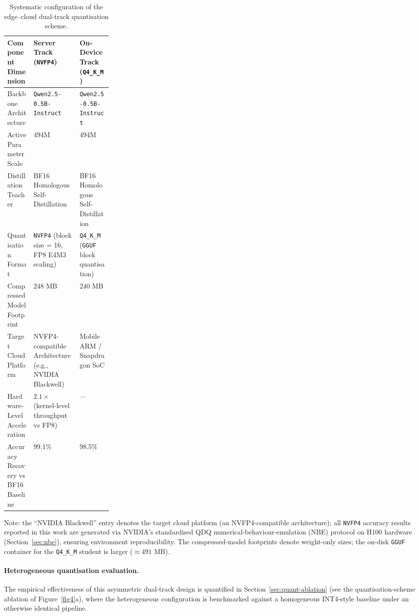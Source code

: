 \documentclass[a4paper,fleqn]{cas-sc}
\begin{document}
\begin{table}[t]
\centering
\renewcommand{\arraystretch}{1.15}
\caption{Systematic configuration of the edge--cloud dual-track quantisation scheme.}
\label{tab2-en}
\setlength{\tabcolsep}{8pt}
\begin{tabularx}{\textwidth}{>{\raggedright\arraybackslash}p{0.25\linewidth}XX}
\toprule
\textbf{Component Dimension} & \textbf{Server Track (\texttt{NVFP4})} & \textbf{On-Device Track (\texttt{Q4\_K\_M})} \\
\midrule
Backbone Architecture & \texttt{Qwen2.5-0.5B-Instruct} & \texttt{Qwen2.5-0.5B-Instruct} \\
Active Parameter Scale & 494M & 494M \\
Distillation Teacher & BF16 Homologous Self-Distillation & BF16 Homologous Self-Distillation \\
Quantisation Format & \texttt{NVFP4} (block size = 16, FP8 E4M3 scaling) & \texttt{Q4\_K\_M} (\texttt{GGUF} block quantisation) \\
Compressed Model Footprint & $248\text{~MB}$ & $240\text{~MB}$ \\
Target Cloud Platform & NVFP4-compatible Architecture (e.g., NVIDIA Blackwell) & Mobile ARM / Snapdragon SoC \\
Hardware-Level Acceleration & $2.1\times$ (kernel-level throughput vs FP8) & --- \\
Accuracy Recovery vs BF16 Baseline & 99.1\% & 98.5\% \\
\bottomrule
\end{tabularx}

\vspace{1mm}
\footnotesize
Note: the ``NVIDIA Blackwell'' entry denotes the target cloud platform (an NVFP4-compatible architecture); all \texttt{NVFP4} accuracy results reported in this work are generated via NVIDIA's standardised QDQ numerical-behaviour-emulation (NBE) protocol on H100 hardware (Section~\ref{sec:nbe}), ensuring environment reproducibility. The compressed-model footprints denote weight-only sizes; the on-disk \texttt{GGUF} container for the \texttt{Q4\_K\_M} student is larger ($\approx 491\text{~MB}$).
\end{table}

\paragraph{Heterogeneous quantisation evaluation.}
The empirical effectiveness of this asymmetric dual-track design is quantified in Section~\ref{sec:quant-ablation} (see the quantisation-scheme ablation of Figure~\ref{fig4}a), where the heterogeneous configuration is benchmarked against a homogeneous INT4-style baseline under an otherwise identical pipeline.
\end{document}
